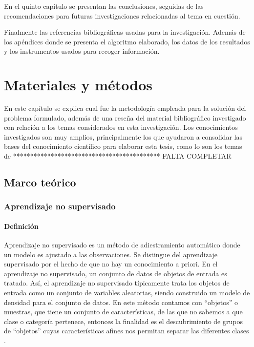 En el quinto capitulo se presentan las conclusiones, seguidas de las recomendaciones para futuras investigaciones relacionadas al tema en cuestión. 

Finalmente las referencias bibliográficas usadas para la investigación. Además de los apéndices donde se presenta el algoritmo elaborado, los datos de los resultados y los instrumentos usados para recoger información.

\chapter{Materiales y métodos}

En este capítulo se explica cual fue la metodología empleada para la solución del problema formulado, además de una reseña del material bibliográfico investigado con relación a los temas considerados en esta investigación. Los conocimientos investigados son muy amplios, principalmente los que ayudaron a consolidar las bases del conocimiento científico para elaborar esta tesis, como lo son los temas de ******************************************* FALTA COMPLETAR


\section{Marco teórico}
\subsection{Aprendizaje no supervisado}

\subsubsection{Definición}

Aprendizaje no supervisado es un método de adiestramiento automático donde un modelo es ajustado a las observaciones. Se distingue del  aprendizaje supervisado por el hecho de que no hay un conocimiento a priori. En el aprendizaje no supervisado, un conjunto de datos de objetos de entrada es tratado. Así, el aprendizaje no supervisado típicamente trata los objetos de entrada como un conjunto de variables aleatorias, siendo construido un modelo de densidad para el conjunto de datos.
\vskip 1cm
En este método contamos con “objetos” o muestras, que tiene un conjunto de características, de las que no sabemos a que clase o categoría pertenece, entonces la finalidad es el descubrimiento de grupos de “objetos” cuyas características afines nos permitan separar las diferentes clases \citep{Araujo}.

